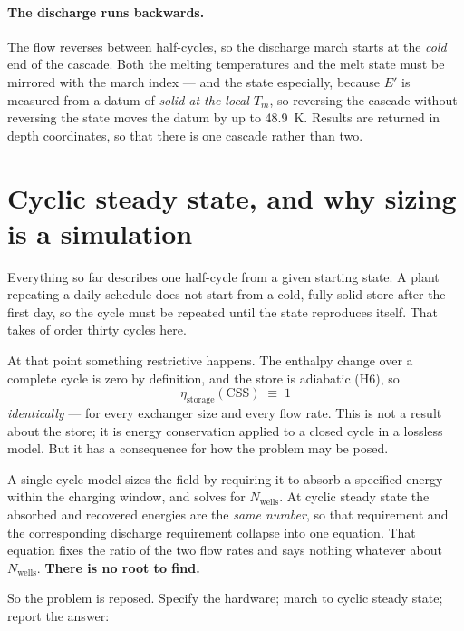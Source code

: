 \documentclass[11pt,a4paper]{article}
\newcommand{\Tm}{\ensuremath{T_{m}}}
\newcommand{\Nwells}{\ensuremath{N_{\mathrm{wells}}}}
\begin{document}
\paragraph{The discharge runs backwards.}
The flow reverses between half-cycles, so the discharge march starts at the
\emph{cold} end of the cascade. Both the melting temperatures and the melt state
must be mirrored with the march index --- and the state especially, because $E'$
is measured from a datum of \emph{solid at the local $\Tm$}, so reversing the
cascade without reversing the state moves the datum by up to
\SI{48.9}{\kelvin}. Results are returned in depth coordinates, so that there is
one cascade rather than two.

\section{Cyclic steady state, and why sizing is a simulation}
\label{sec:css}

Everything so far describes one half-cycle from a given starting state. A plant
repeating a daily schedule does not start from a cold, fully solid store after
the first day, so the cycle must be repeated until the state reproduces itself.
That takes of order thirty cycles here.

At that point something restrictive happens. The enthalpy change over a
complete cycle is zero by definition, and the store is adiabatic (H6), so
\begin{equation}
  \eta_{\mathrm{storage}}(\mathrm{CSS}) \;\equiv\; 1
  \label{eq:unity}
\end{equation}
\emph{identically} --- for every exchanger size and every flow rate. This is not
a result about the store; it is energy conservation applied to a closed cycle in
a lossless model. But it has a consequence for how the problem may be posed.

A single-cycle model sizes the field by requiring it to absorb a specified
energy within the charging window, and solves for $\Nwells$. At cyclic steady
state the absorbed and recovered energies are the \emph{same number}, so that
requirement and the corresponding discharge requirement collapse into one
equation. That equation fixes the ratio of the two flow rates and says nothing
whatever about $\Nwells$. \textbf{There is no root to find.}

So the problem is reposed. Specify the hardware; march to cyclic steady state;
report the answer:
\end{document}
